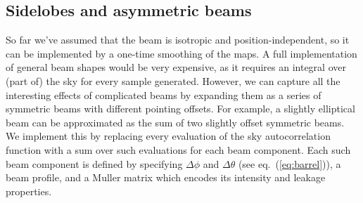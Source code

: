 \documentclass{article}
\begin{document}
\subsection{Sidelobes and asymmetric beams}
So far we've assumed that the beam is isotropic and position-independent,
so it can be implemented by a one-time smoothing of the maps. A full
implementation of general beam shapes would be very expensive, as it
requires an integral over (part of) the sky for every sample generated.
However, we can capture all the interesting effects of complicated beams
by expanding them as a series of symmetric beams with different pointing
offsets. For example, a slightly elliptical beam can be approximated as
the sum of two slightly offset symmetric beams.
We implement this by replacing every evaluation of the sky autocorrelation
function with a sum over such evaluations for each beam component.
Each such beam component is defined by specifying
$\Delta\phi$ and $\Delta\theta$ (see eq.~(\ref{eq:barrel})),
a beam profile, and a Muller matrix which encodes its
intensity and leakage properties.
\end{document}
